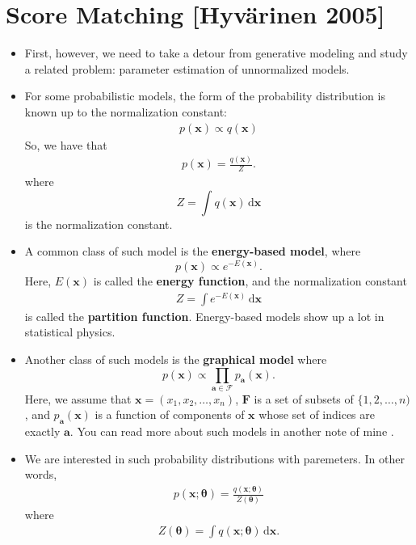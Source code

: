 \documentclass[10pt]{article}
\newcommand{\dee}{\mathrm{d}}
\newcommand{\ve}[1]{\mathbf{#1}}
\begin{document}
\section{Score Matching [Hyv\"{a}rinen 2005]}

\begin{itemize}
  \item First, however, we need to take a detour from generative modeling and study a related problem: parameter estimation of unnormalized models.
  
  \item For some probabilistic models, the form of the probability distribution is known up to the normalization constant:
  \begin{align*}
      p(\ve{x}) \propto q(\ve{x})
  \end{align*}
  So, we have that
  \begin{align*}
      p(\ve{x}) = \frac{q(\ve{x})}{Z}.
  \end{align*}
  where $$Z = \int q(\ve{x})\, \dee\ve{x}$$ is the normalization constant.

  \item A common class of such model is the {\bf energy-based model}, where $$p(\ve{x}) \propto e^{-E(\ve{x})}.$$ Here, $E(\ve{x})$ is called the {\bf energy function}, and the normalization constant
  \begin{align*}
  Z = \int e^{-E(\ve{x})}\, \dee\ve{x}
  \end{align*}
  is called the {\bf partition function}. Energy-based models show up a lot in statistical physics.

  \item Another class of such models is the {\bf graphical model} where $$p(\ve{x}) \propto \prod_{\ve{a} \in \mathcal{F}} p_\ve{a}(\ve{x}).$$ Here, we assume that $\ve{x} = (x_1, x_2, \dotsc, x_n)$, $\ve{F}$ is a set of subsets of $\{1,2,\dotsc,n)$, and $p_\ve{a}(\ve{x})$ is a function of components of $\ve{x}$ whose set of indices are exactly $\ve{a}$. You can read more about such models in another note of mine \cite{KhungurnCrf}.
  
  \item We are interested in such probability distributions with paremeters. In other words,
  \begin{align*}
      p(\ve{x};\boldsymbol{\theta}) = \frac{q(\ve{x};\boldsymbol{\theta})}{Z(\boldsymbol{\theta})}
  \end{align*}
  where
  \begin{align*}
      Z(\boldsymbol{\theta}) = \int q(\ve{x};\boldsymbol{\theta})\, \dee\ve{x}.
  \end{align*}


\end{itemize}
\end{document}
